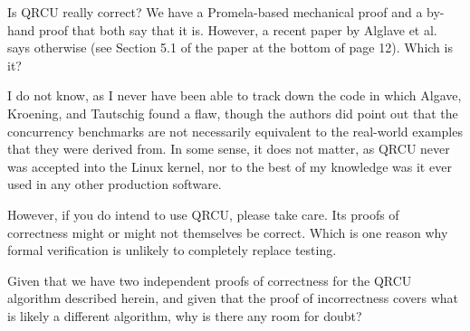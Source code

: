 Is QRCU really correct?
We have a Promela-based mechanical proof and a by-hand proof that both
say that it is.
However, a recent paper by Alglave et al.~\cite{JadeAlglave2013-cav}
says otherwise (see Section 5.1 of the paper at the bottom of page 12).
Which is it?

I do not know, as I never have been able to track down the code in which
Algave, Kroening, and Tautschig found a flaw, though the authors did
point out that the concurrency benchmarks are not necessarily equivalent
to the real-world examples that they were derived from.
In some sense, it does not matter, as QRCU never was accepted into the
Linux kernel, nor to the best of my knowledge was it ever used in any
other production software.

However, if you do intend to use QRCU, please take care.
Its proofs of correctness might or might not themselves be correct.
Which is one reason why formal verification is unlikely to
completely replace testing.

\QuickQuiz{}
	Given that we have two independent proofs of correctness for
	the QRCU algorithm described herein, and given that the
	proof of incorrectness covers what is likely a different
	algorithm, why is there any room for doubt?
 \QuickQuizEnd

